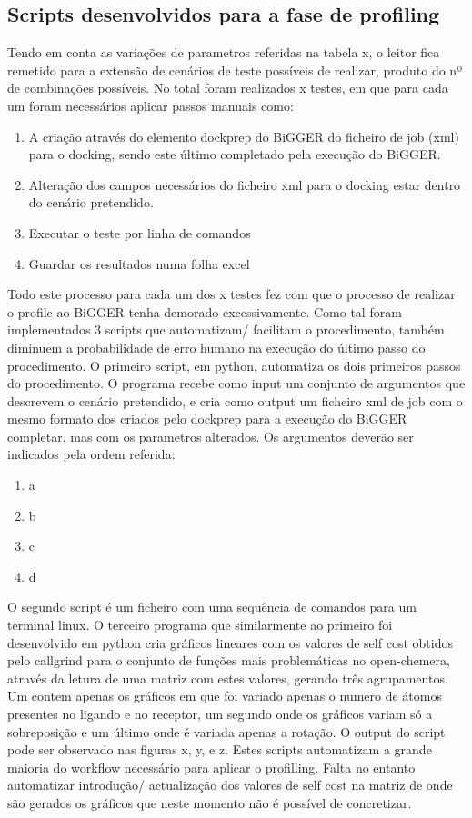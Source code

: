 \subsection{Scripts desenvolvidos para a fase de profiling}
Tendo em conta as variações de parametros referidas na tabela x, o leitor fica remetido para a extensão de cenários de teste possíveis de realizar, produto do nº de combinações possíveis. No total foram realizados x testes, em que para cada um foram necessários aplicar passos manuais como:
\begin{enumerate}
	\item{A criação através do elemento dockprep do BiGGER do ficheiro de job (xml) para o docking, sendo este último completado pela execução do BiGGER.}
	\item{Alteração dos campos necessários do ficheiro xml para o docking estar dentro do cenário pretendido. }
	\item{Executar o teste por linha de comandos}
	\item{Guardar os resultados numa folha excel}
\end{enumerate} 
Todo este processo para cada um dos x testes fez com que o processo de realizar o profile ao BiGGER tenha demorado excessivamente. Como tal foram implementados 3 scripts que automatizam/ facilitam o procedimento, também diminuem a probabilidade de erro humano na execução do último passo do procedimento. O primeiro script, em python, automatiza os dois primeiros passos do procedimento. O programa recebe como input um conjunto de argumentos que descrevem o cenário pretendido, e cria como output um ficheiro xml de job com o mesmo formato dos criados pelo dockprep para a execução do BiGGER completar, mas com os parametros alterados. Os argumentos deverão ser indicados pela ordem referida:
\begin{enumerate}
	\item{a}
	\item{b}
	\item{c}
	\item{d}
\end{enumerate} 
O segundo script é um ficheiro com uma sequência de comandos para um terminal linux. O terceiro programa que similarmente ao primeiro foi desenvolvido em python cria gráficos lineares com os valores de self cost obtidos pelo callgrind para o conjunto de funções mais problemáticas no open-chemera, através da letura de uma matriz com estes valores, gerando três agrupamentos. Um contem apenas os gráficos em que foi variado apenas o numero de átomos presentes no ligando e no receptor, um segundo onde os gráficos variam só a sobreposição e um último onde é variada apenas a rotação. O output do script pode ser observado nas figuras x, y, e z.
Estes scripts automatizam a grande maioria do workflow necessário para aplicar o profilling. Falta no entanto automatizar introdução/ actualização dos valores de self cost na matriz de onde são gerados os gráficos que neste momento não é possível de concretizar. 

